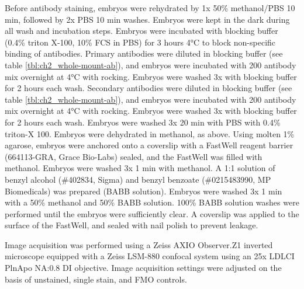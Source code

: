 Before antibody staining, embryos were rehydrated by 1x 50\% methanol/PBS 10 min, followed by 2x PBS 10 min washes. Embryos were kept in the dark during all wash and incubation steps. Embryos were incubated with blocking buffer (0.4\% triton X-100, 10\% FCS in PBS) for 3 hours 4°C to block non-specific binding of antibodies. Primary antibodies were diluted in blocking buffer (see table \ref{tbl:ch2_whole-mount-ab}), and embryos were incubated with 200 \microl{} antibody mix overnight at 4°C with rocking. Embryos were washed 3x with blocking buffer for 2 hours each wash. Secondary antibodies were diluted in blocking buffer (see table \ref{tbl:ch2_whole-mount-ab}), and embryos were incubated with 200 \microl{} antibody mix overnight at 4°C with rocking. Embryos were washed 3x with blocking buffer for 2 hours each wash. Embryos were washed 3x 20 min with PBS with 0.4\% triton-X 100. Embryos were dehydrated in methanol, as above. Using molten 1\% agarose, embryos were anchored onto a coverslip with a FastWell reagent barrier (664113-GRA, Grace Bio-Labs) sealed, and the FastWell was filled with methanol. Embryos were washed 3x 1 min with methanol. A 1:1 solution of benzyl alcohol (\#402834, Sigma) and benzyl benzoate (\#0215483990, MP Biomedicals) was prepared (BABB solution). Embryos were washed 3x 1 min with a 50\% methanol and 50\% BABB solution. 100\% BABB solution washes were performed until the embryos were sufficiently clear. A coverslip was applied to the surface of the FastWell, and sealed with nail polish to prevent leakage. 

Image acquisition was performed using a Zeiss AXIO Observer.Z1 inverted microscope equipped with a Zeiss LSM-880 confocal system using an 25x LDLCI PlnApo NA:0.8 DI objective. Image acquisition settings were adjusted on the basis of unstained, single stain, and FMO controls.

    \begin{table}[ht]
    \caption{Antibodies used for whole-mount immunofluorescence.}
    \label{tbl:ch2_whole-mount-ab}
    \end{table}


